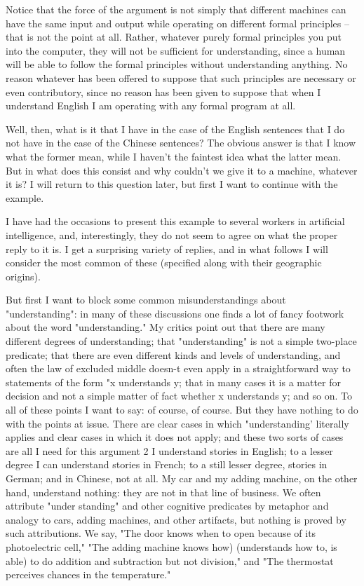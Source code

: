 Notice that the force of the argument is not simply that different machines can have the same input and output
while operating on different formal principles -- that is not the point at all. Rather, whatever purely formal
principles you put into the computer, they will not be sufficient for understanding, since a human will be able to
follow the formal principles without understanding anything. No reason whatever has been offered to suppose
that such principles are necessary or even contributory, since no reason has been given to suppose that when I
understand English I am operating with any formal program at all.

Well, then, what is it that I have in the case of the English sentences that I do not have in the case of the
Chinese sentences? The obvious answer is that I know what the former mean, while I haven't the faintest idea
what the latter mean. But in what does this consist and why couldn't we give it to a machine, whatever it is? I
will return to this question later, but first I want to continue with the example.

I have had the occasions to present this example to several workers in artificial intelligence, and, interestingly,
they do not seem to agree on what the proper reply to it is. I get a surprising variety of replies, and in what
follows I will consider the most common of these (specified along with their geographic origins).

But first I want to block some common misunderstandings about "understanding": in many of these discussions
one finds a lot of fancy footwork about the word "understanding." My critics point out that there are many
different degrees of understanding; that "understanding" is not a simple two-place predicate; that there are even
different kinds and levels of understanding, and often the law of excluded middle doesn-t even apply in a
straightforward way to statements of the form "x understands y; that in many cases it is a matter for decision and
not a simple matter of fact whether x understands y; and so on. To all of these points I want to say: of course, of
course. But they have nothing to do with the points at issue. There are clear cases in which "understanding' literally applies and clear cases in which it does not apply; and these two sorts of cases are all I need for this argument 2 I understand stories in English; to a lesser degree I can understand stories in French; to a still lesser
degree, stories in German; and in Chinese, not at all. My car and my adding machine, on the other hand,
understand nothing: they are not in that line of business. We often attribute "under standing" and other cognitive
predicates by metaphor and analogy to cars, adding machines, and other artifacts, but nothing is proved by such
attributions. We say, "The door knows when to open because of its photoelectric cell," "The adding machine
knows how) (understands how to, is able) to do addition and subtraction but not division," and "The thermostat
perceives chances in the temperature."

